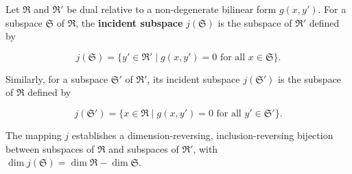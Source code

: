 Let $\mathfrak{R}$ and $\mathfrak{R}'$ be dual relative to a non-degenerate bilinear form $g(x, y')$. For a subspace $\mathfrak{S}$ of $\mathfrak{R}$, the \textbf{incident subspace} $j(\mathfrak{S})$ is the subspace of $\mathfrak{R}'$ defined by

$$j(\mathfrak{S}) = \{ y' \in \mathfrak{R}' \mid g(x, y') = 0 \text{ for all } x \in \mathfrak{S} \}.$$

Similarly, for a subspace $\mathfrak{S}'$ of $\mathfrak{R}'$, its incident subspace $j(\mathfrak{S}')$ is the subspace of $\mathfrak{R}$ defined by

$$j(\mathfrak{S}') = \{ x \in \mathfrak{R} \mid g(x, y') = 0 \text{ for all } y' \in \mathfrak{S}' \}.$$

The mapping $j$ establishes a dimension-reversing, inclusion-reversing bijection between subspaces of $\mathfrak{R}$ and subspaces of $\mathfrak{R}'$, with $\dim j(\mathfrak{S}) = \dim \mathfrak{R} - \dim \mathfrak{S}$.

